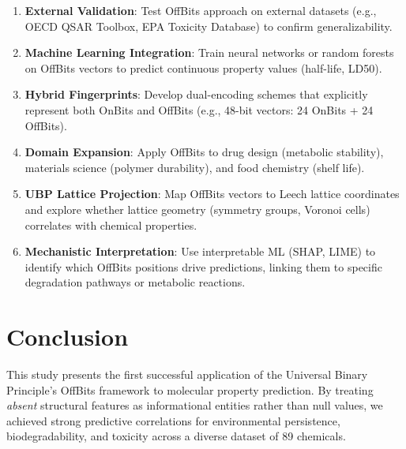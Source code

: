 \documentclass[11pt,letterpaper]{article}
\begin{document}
\begin{enumerate}
    \item \textbf{External Validation}: Test OffBits approach on external datasets (e.g., OECD QSAR Toolbox, EPA Toxicity Database) to confirm generalizability.

    \item \textbf{Machine Learning Integration}: Train neural networks or random forests on OffBits vectors to predict continuous property values (half-life, LD50).

    \item \textbf{Hybrid Fingerprints}: Develop dual-encoding schemes that explicitly represent both OnBits and OffBits (e.g., 48-bit vectors: 24 OnBits + 24 OffBits).

    \item \textbf{Domain Expansion}: Apply OffBits to drug design (metabolic stability), materials science (polymer durability), and food chemistry (shelf life).

    \item \textbf{UBP Lattice Projection}: Map OffBits vectors to Leech lattice coordinates and explore whether lattice geometry (symmetry groups, Voronoi cells) correlates with chemical properties.

    \item \textbf{Mechanistic Interpretation}: Use interpretable ML (SHAP, LIME) to identify which OffBits positions drive predictions, linking them to specific degradation pathways or metabolic reactions.
\end{enumerate}

\section{Conclusion}

This study presents the first successful application of the Universal Binary Principle's OffBits framework to molecular property prediction. By treating \textit{absent} structural features as informational entities rather than null values, we achieved strong predictive correlations for environmental persistence, biodegradability, and toxicity across a diverse dataset of 89 chemicals.
\end{document}
